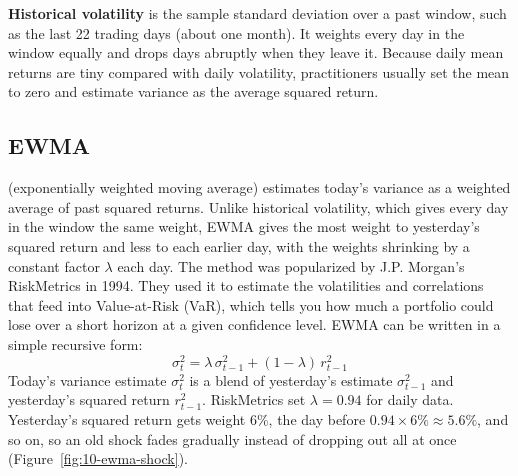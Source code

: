 \textbf{Historical volatility} is the sample standard deviation over a past window, such as the last 22 trading days (about one month). It weights every day in the window equally and drops days abruptly when they leave it. Because daily mean returns are tiny compared with daily volatility, practitioners usually set the mean to zero and estimate variance as the average squared return.

\subsection{EWMA}


 (exponentially weighted moving average) estimates today's variance as a weighted average of past squared returns. Unlike historical volatility, which gives every day in the window the same weight, EWMA gives the most weight to yesterday's squared return and less to each earlier day, with the weights shrinking by a constant factor $\lambda$ each day. The method was popularized by J.P. Morgan's RiskMetrics in 1994.
They used it to estimate the volatilities and correlations that feed into Value-at-Risk (VaR), which tells you how much a portfolio could lose over a short horizon at a given confidence level.
EWMA can be written in a simple recursive form:
\begin{equation}
  \sigma^2_t = \lambda\,\sigma^2_{t-1} + (1 - \lambda)\,r^2_{t-1}
  \label{eq:10-ewma}
\end{equation}
Today's variance estimate $\sigma^2_t$ is a blend of yesterday's estimate $\sigma^2_{t-1}$ and yesterday's squared return $r^2_{t-1}$.
RiskMetrics set $\lambda = 0.94$ for daily data. Yesterday's squared return gets weight 6\%, the day before $0.94 \times 6\% \approx 5.6\%$, and so on, so an old shock fades gradually instead of dropping out all at once (Figure~\ref{fig:10-ewma-shock}).


